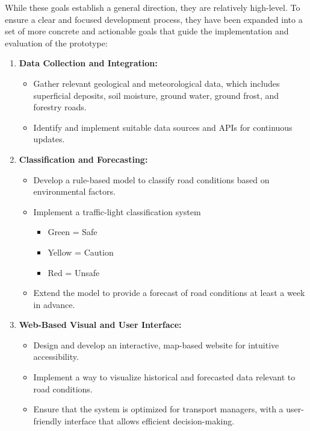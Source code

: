 While these goals establish a general direction, they are relatively high-level. To ensure a clear and focused development process, they have been expanded into a set of more concrete and actionable goals that guide the implementation and evaluation of the prototype:

\begin{enumerate}
    \item \textbf{Data Collection and Integration:}
    \begin{itemize}
        \item Gather relevant geological and meteorological data, which includes superficial deposits, soil moisture, ground water, ground frost, and forestry roads.
        \item Identify and implement suitable data sources and APIs for continuous updates.
    \end{itemize}
    
    \item \textbf{Classification and Forecasting:}
    \begin{itemize}
        \item Develop a rule-based model to classify road conditions based on environmental factors. 
        \item Implement a traffic-light classification system
        \begin{itemize}
            \item Green = Safe
            \item Yellow = Caution
            \item Red = Unsafe
        \end{itemize}
        \item Extend the model to provide a forecast of road conditions at least a week in advance. 
    \end{itemize}
    
    \item \textbf{Web-Based Visual and User Interface:}
    \begin{itemize}
        \item Design and develop an interactive, map-based website for intuitive accessibility. 
        \item Implement a way to visualize historical and forecasted data relevant to road conditions.
        \item Ensure that the system is optimized for transport managers, with a user-friendly interface that allows efficient decision-making. 
    \end{itemize}
    

\end{enumerate}
